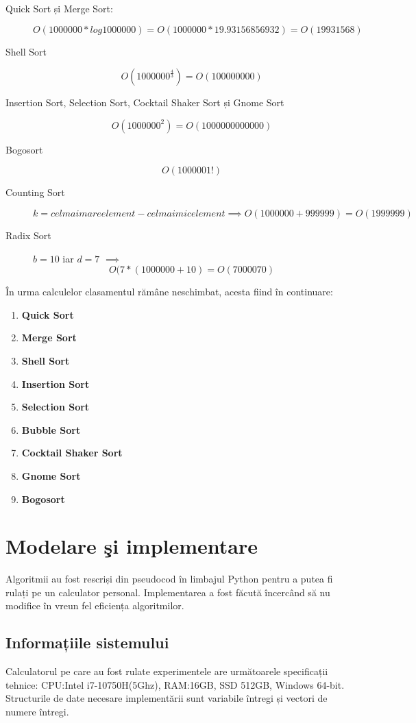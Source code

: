 \documentclass[12pt]{article}
\begin{document}
\begin{description}
    \item[Quick Sort și Merge Sort:] 
    \[O(1000000*log1000000)=
    O(1000000*19.93156856932)=O(19931568) \] 
    \item[ Shell Sort]
    \[ O(1000000^\frac{4}{3})=O(100000000)\]
    \item[Insertion Sort, Selection Sort, Cocktail Shaker Sort și Gnome Sort] 
    \[O(1000000^2)=O(1000000000000)\] 
    \item[Bogosort]
    \[O(1000001!)\]
    \item[Counting Sort] 
    \[k=cel mai mare element - cel mai mic element \implies
      O(1000000+999999)=O(1999999)\] 
    \item[Radix Sort] $b=10$ iar $d=7$
 $\implies$ \[O(7*(1000000+10)=O(7000070)\]
\end{description}
În urma calculelor clasamentul rămâne neschimbat, acesta fiind în continuare: 
\begin{enumerate}[P1.]
        \item  \textbf{Quick Sort}
        \item  \textbf{Merge Sort}
        \item  \textbf{Shell Sort}
        \item  \textbf{Insertion Sort}
        \item  \textbf{Selection Sort}
        \item  \textbf{Bubble Sort}
        \item  \textbf{Cocktail Shaker Sort}
        \item  \textbf{Gnome Sort}
        \item  \textbf{Bogosort}
    \end{enumerate}
\section{Modelare şi implementare}
\label{sec:modelare}
Algoritmii au fost rescriși din pseudocod în limbajul Python pentru a putea fi rulați pe un calculator personal. Implementarea a fost făcută încercând să nu modifice în vreun fel eficiența algoritmilor.
\subsection{ Informațiile sistemului}
Calculatorul pe care au fost rulate experimentele are următoarele specificații tehnice:
CPU:Intel i7-10750H(5Ghz), RAM:16GB, SSD 512GB, Windows 64-bit.
Structurile de date necesare implementării sunt variabile întregi și vectori de numere întregi.
\end{document}
